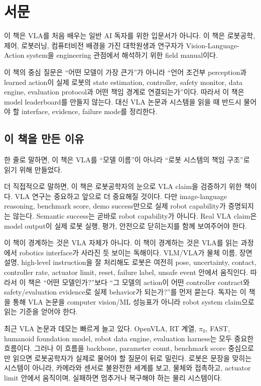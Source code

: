 \chapter*{서문}

이 책은 VLA를 처음 배우는 일반 AI 독자를 위한 입문서가 아니다. 이 책은 로봇공학, 제어, 로봇러닝, 컴퓨터비전 배경을 가진 대학원생과 연구자가 Vision-Language-Action system을 engineering 관점에서 해석하기 위한 field manual이다.

이 책의 중심 질문은 ``어떤 모델이 가장 큰가''가 아니라 ``언어 조건부 perception과 learned action이 실제 로봇의 state estimation, controller, safety monitor, data engine, evaluation protocol과 어떤 책임 경계로 연결되는가''이다. 따라서 이 책은 model leaderboard를 만들지 않는다. 대신 VLA 논문과 시스템을 읽을 때 반드시 물어야 할 interface, evidence, failure mode를 정리한다.

\section*{이 책을 만든 이유}

한 줄로 말하면, 이 책은 VLA를 ``모델 이름''이 아니라 ``로봇 시스템의 책임 구조''로 읽기 위해 만들었다.

더 직접적으로 말하면, 이 책은 로봇공학자의 눈으로 VLA claim을 검증하기 위한 책이다. VLA 연구는 중요하고 앞으로 더 중요해질 것이다. 다만 image-language reasoning, benchmark score, demo success만으로 실제 robot capability가 증명되지는 않는다. Semantic success는 곧바로 robot capability가 아니다. Real VLA claim은 model output이 실제 로봇 실행, 평가, 안전으로 닫히는지를 함께 보여주어야 한다.

이 책이 경계하는 것은 VLA 자체가 아니다. 이 책이 경계하는 것은 VLA를 읽는 과정에서 robotics interface가 사라진 듯 보이는 독해이다. VLM/VLA가 물체 이름, 장면 설명, high-level instruction을 잘 처리해도 로봇은 여전히 pose, uncertainty, contact, controller rate, actuator limit, reset, failure label, unsafe event 안에서 움직인다. 따라서 이 책은 ``어떤 모델인가?''보다 ``그 모델의 action이 어떤 controller contract와 safety/evaluation evidence로 실제 behavior가 되는가?''를 먼저 묻는다. 독자는 이 책을 통해 VLA 논문을 computer vision/ML 성능표가 아니라 robot system claim으로 읽는 기준을 얻어야 한다.

최근 VLA 논문과 데모는 빠르게 늘고 있다. OpenVLA, RT 계열, $\pi_0$, FAST, humanoid foundation model, robot data engine, evaluation harness는 모두 중요한 흐름이다. 그러나 이 흐름을 backbone, parameter count, benchmark score 중심으로만 읽으면 로봇공학자가 실제로 물어야 할 질문이 뒤로 밀린다. 로봇은 문장을 맞히는 시스템이 아니라, 카메라와 센서로 불완전한 세계를 보고, 물체와 접촉하고, actuator limit 안에서 움직이며, 실패하면 멈추거나 복구해야 하는 물리 시스템이다.

